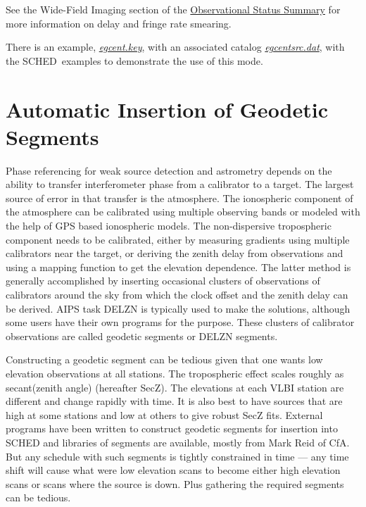 \documentclass{report}
\newcommand{\schedb}{{\sc SCHED~}}
\begin{document}
See the Wide-Field Imaging section of the
{\href{http://www.vlba.nrao.edu/astro/obstatus/current/}{Observational Status Summary}}
for more information on delay and fringe rate smearing.


There is an example, 
{\href{examples/egcent.key}{{\sl egcent.key}}}, with an
associated catalog 
{\href{examples/egcentsrc.dat}{{\sl egcentsrc.dat}}},
with the \schedb examples to demonstrate the use of this mode.

\section{\label{SEC:GEOSEG}Automatic Insertion of Geodetic Segments}

Phase referencing for weak source detection and astrometry depends on
the ability to transfer interferometer phase from a calibrator to a
target.  The largest source of error in that transfer is the
atmosphere.  The ionospheric component of the atmosphere can be
calibrated using multiple observing bands or modeled with the help of
GPS based ionospheric models.  The non-dispersive tropospheric
component needs to be calibrated, either by measuring gradients using
multiple calibrators near the target, or deriving the zenith delay
from observations and using a mapping function to get the elevation
dependence.  The latter method is generally accomplished by inserting
occasional clusters of observations of calibrators around the sky from
which the clock offset and the zenith delay can be derived.  AIPS task
DELZN is typically used to make the solutions, although some users
have their own programs for the purpose.  These clusters of calibrator
observations are called geodetic segments or DELZN segments.

Constructing a geodetic segment can be tedious given that one wants
low elevation observations at all stations.  The tropospheric effect
scales roughly as secant(zenith angle) (hereafter SecZ).  The
elevations at each VLBI station are different and change rapidly with
time.  It is also best to have sources that are high at some stations
and low at others to give robust SecZ fits.  External programs have
been written to construct geodetic segments for insertion into SCHED and
libraries of segments are available, mostly from Mark Reid of CfA.
But any schedule with such segments is tightly constrained in time ---
any time shift will cause what were low elevation scans to become
either high elevation scans or scans where the source is down.  Plus
gathering the required segments can be tedious.
\end{document}

